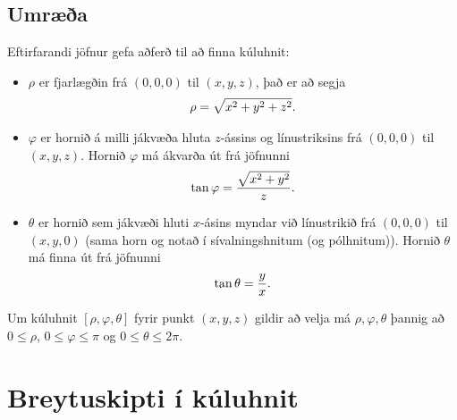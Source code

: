 \documentclass[a4paper,10pt,icelandic]{sphinxmanual}
\begin{document}
\subsection{Umræða}
\label{Kafli4:id20}
Eftirfarandi jöfnur gefa aðferð til að finna kúluhnit:
\begin{itemize}
\item {} 
\(\rho\) er fjarlægðin frá \((0,0,0)\) til \((x,y,z)\), það er að
segja
\begin{gather}
\begin{split}\displaystyle \rho=\sqrt{x^2+y^2+z^2}.\end{split}\notag
\end{gather}
\item {} 
\(\varphi\) er hornið á milli jákvæða hluta \(z\)-ássins og línustriksins frá
\((0,0,0)\) til \((x,y,z)\). Hornið \(\varphi\) má
ákvarða út frá jöfnunni
\begin{gather}
\begin{split}\displaystyle \tan\varphi=\frac{\sqrt{x^2+y^2}}{z}.\end{split}\notag
\end{gather}
\item {} 
\(\theta\) er hornið sem jákvæði hluti \(x\)-ásins myndar við línustrikið
frá \((0,0,0)\) til \((x,y,0)\) (sama horn og notað í
sívalningshnitum (og pólhnitum)). Hornið \(\theta\) má finna út
frá jöfnunni
\begin{gather}
\begin{split}\displaystyle \tan\theta=\frac{y}{x}.\end{split}\notag
\end{gather}
\end{itemize}

Um kúluhnit \([\rho, \varphi, \theta]\) fyrir punkt \((x,y,z)\)
gildir að velja má \(\rho, \varphi, \theta\) þannig að
\(0\leq \rho\), \(0\leq\varphi\leq \pi\) og
\(0\leq\theta\leq 2\pi\).


\section{Breytuskipti í kúluhnit}
\label{Kafli4:breytuskipti-i-kuluhnit}
\end{document}
